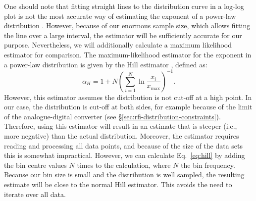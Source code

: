 \documentclass[useAMS,usenatbib]{mn2e}
\begin{document}
One should note that fitting straight lines to the distribution curve in a log-log plot is not the most accurate way of estimating the exponent of a power-law distribution \citep{power-law-distribution}. However, because of our enormous sample size, which allows fitting the line over a large interval, the estimator will be sufficiently accurate for our purpose. Nevertheless, we will additionally calculate a maximum likelihood estimator for comparison. The maximum-likelihood estimator for the exponent in a power-law distribution is given by the Hill estimator \citep{hill-estimator, power-law-distribution}, defined as:
\begin{equation} \label{eq:hill}
 \alpha_H = 1 + N \left(\sum\limits_{i=1}^{N} \ln \frac{x_i}{x_\textrm{max}} \right)^{-1}.
\end{equation}
However, this estimator assumes the distribution is not cut-off at a high point. In our case, the distribution is cut-off at both sides, for example because of the limit of the analogue-digital converter (see \S\ref{sec:rfi-distribution-constraints}). Therefore, using this estimator will result in an estimate that is steeper (i.e., more negative) than the actual distribution. Moreover, the estimator requires reading and processing all data points, and because of the size of the data sets this is somewhat impractical. However, we can calculate Eq.~\eqref{eq:hill} by adding the bin centre values $N$ times to the calculation, where $N$ the bin frequency. Because our bin size is small and the distribution is well sampled, the resulting estimate will be close to the normal Hill estimator. This avoids the need to iterate over all data.
\end{document}
